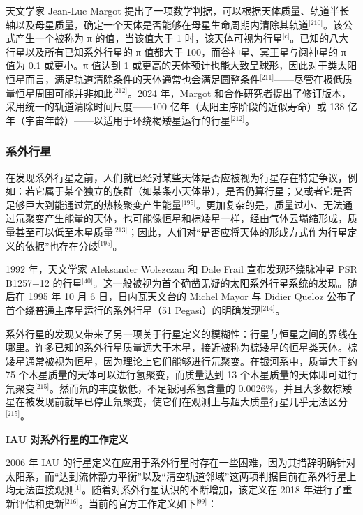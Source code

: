 天文学家 Jean-Luc Margot 提出了一项数学判据，可以根据天体质量、轨道半长轴以及母星质量，确定一个天体是否能够在母星生命周期内清除其轨道\(^\text{[210]}\)。该公式产生一个被称为 π 的值，当该值大于 1 时，该天体可视为行星\(^\text{[c]}\)。已知的八大行星以及所有已知系外行星的 π 值都大于 100，而谷神星、冥王星与阋神星的 π 值为 0.1 或更小。π 值达到 1 或更高的天体预计也能大致呈球形，因此对于类太阳恒星而言，满足轨道清除条件的天体通常也会满足圆整条件\(^\text{[211]}\)——尽管在极低质量恒星周围可能并非如此\(^\text{[212]}\)。2024 年，Margot 和合作研究者提出了修订版本，采用统一的轨道清除时间尺度——100 亿年（太阳主序阶段的近似寿命）或 138 亿年（宇宙年龄）——以适用于环绕褐矮星运行的行星\(^\text{[212]}\)。
\subsubsection{系外行星}
在发现系外行星之前，人们就已经对某些天体是否应被视为行星存在特定争议，例如：若它属于某个独立的族群（如某条小天体带），是否仍算行星；又或者它是否足够巨大到能通过氘的热核聚变产生能量\(^\text{[195]}\)。更加复杂的是，质量过小、无法通过氘聚变产生能量的天体，也可能像恒星和棕矮星一样，经由气体云塌缩形成，质量甚至可以低至木星质量\(^\text{[213]}\)；因此，人们对“是否应将天体的形成方式作为行星定义的依据”也存在分歧\(^\text{[195]}\)。

1992 年，天文学家 Aleksander Wolszczan 和 Dale Frail 宣布发现环绕脉冲星 PSR B1257+12 的行星\(^\text{[40]}\)。这一般被视为首个确凿无疑的太阳系外行星系统的发现。随后在 1995 年 10 月 6 日，日内瓦天文台的 Michel Mayor 与 Didier Queloz 公布了首个绕普通主序星运行的系外行星（51 Pegasi）的明确发现\(^\text{[214]}\)。

系外行星的发现又带来了另一项关于行星定义的模糊性：行星与恒星之间的界线在哪里。许多已知的系外行星质量远大于木星，接近被称为棕矮星的恒星类天体。棕矮星通常被视为恒星，因为理论上它们能够进行氘聚变。在银河系中，质量大于约 75 个木星质量的天体可以进行氢聚变，而质量达到 13 个木星质量的天体即可进行氘聚变\(^\text{[215]}\)。然而氘的丰度极低，不足银河系氢含量的 0.0026\%，并且大多数棕矮星在被发现前就早已停止氘聚变，使它们在观测上与超大质量行星几乎无法区分\(^\text{[215]}\)。

\textbf{IAU 对系外行星的工作定义}

2006 年 IAU 的行星定义在应用于系外行星时存在一些困难，因为其措辞明确针对太阳系，而“达到流体静力平衡”以及“清空轨道邻域”这两项判据目前在系外行星上均无法直接观测\(^\text{[1]}\)。随着对系外行星认识的不断增加，该定义在 2018 年进行了重新评估和更新\(^\text{[216]}\)。当前的官方工作定义如下\(^\text{[99]}\)：


